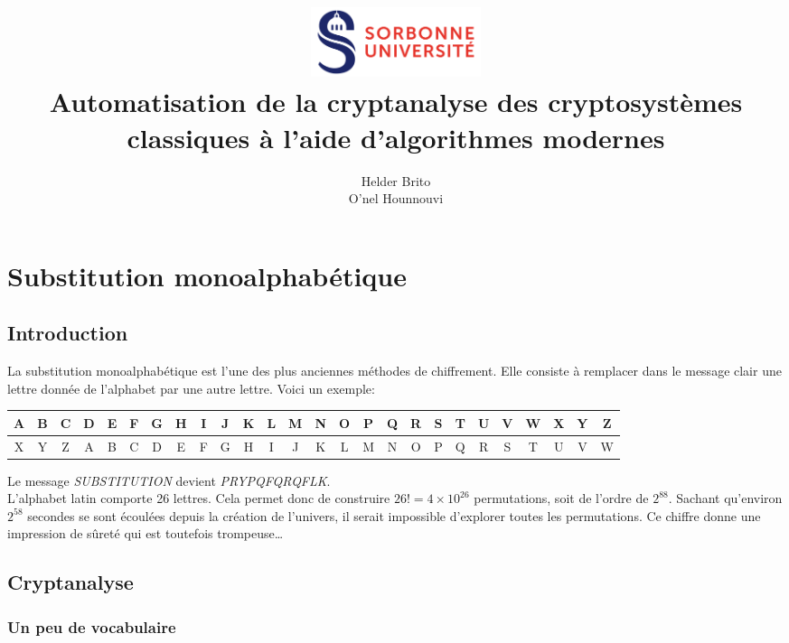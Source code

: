 \documentclass[a4paper]{article}
\title{
    \includegraphics[width=5cm]{logo_su.jpg} \\[1em]
    \Huge Automatisation de la cryptanalyse des cryptosystèmes classiques à l’aide d’algorithmes modernes
}
\author{Helder Brito\\O'nel Hounnouvi}
\date{}
\begin{document}
\maketitle 
\clearpage 
\tableofcontents
\clearpage 

\section{Substitution monoalphabétique}

\subsection{Introduction}

La substitution monoalphabétique est l'une des plus anciennes méthodes de chiffrement. Elle consiste à remplacer dans le message clair une lettre donnée de l'alphabet par une autre lettre. Voici un exemple:

\vspace{1em}
\begin{adjustbox}{width=\textwidth,center}
    \begin{tabular}{|c|c|c|c|c|c|c|c|c|c|c|c|c|c|c|c|c|c|c|c|c|c|c|c|c|c|}
        \hline
        A & B & C & D & E & F & G & H & I & J & K & L & M & N & O & P & Q & R & S & T & U & V & W & X & Y & Z \\
        \hline
        X & Y & Z & A & B & C & D & E & F & G & H & I & J & K & L & M & N & O & P & Q & R & S & T & U & V & W \\
        \hline
    \end{tabular}
\end{adjustbox}
\vspace{1em}

Le message \textit{SUBSTITUTION} devient \textit{PRYPQFQRQFLK}.\\

L'alphabet latin comporte 26 lettres. Cela permet donc de construire $26! = 4 \times 10^{26}$ permutations, soit de l'ordre de $2^{88}$.  
Sachant qu’environ $2^{58}$ secondes se sont écoulées depuis la création de l’univers, il serait impossible d’explorer toutes les permutations.  
Ce chiffre donne une impression de sûreté qui est toutefois trompeuse\ldots

\subsection{Cryptanalyse}

\subsubsection{Un peu de vocabulaire}
\end{document}
